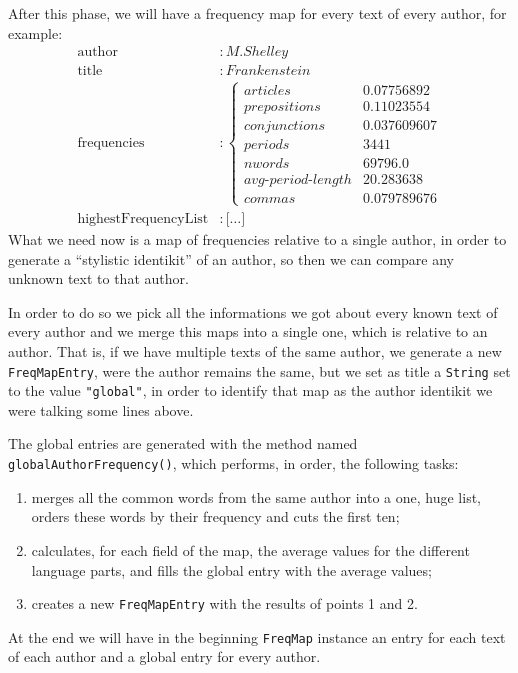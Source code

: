 \documentclass[a4paper,11pt, twoside]{article}
\begin{document}
	After this phase, we will have a frequency map for every text of every author, for example: \begin{align*}
		\text{author}&: M. Shelley \\
		\text{title} &: Frankenstein \\
		\text{frequencies}&:\begin{cases}
			articles &0.07756892 \\
			prepositions &0.11023554 \\
			conjunctions &0.037609607 \\
			periods &3441 \\
			nwords &69796.0 \\
			avg\text{-}period\text{-}length &20.283638 \\
			commas &0.079789676 
		\end{cases} \\
		\text{highestFrequencyList}&: \lbrack \dots \rbrack
	\end{align*}
	 What we need now is a map of frequencies relative to a single author, in order to generate a ``stylistic identikit''  of an author, so then we can compare any unknown text to that author.
	 
	 In order to do so we pick all the informations we got about every known text of every author and we merge this maps into a single one, which is relative to an author. That is, if we have multiple texts of the same author, we generate a new \lstinline|FreqMapEntry|, were the author remains the same, but we set as title a \lstinline|String| set to the value \lstinline|"global"|, in order to identify that map as the author identikit we were talking some lines above.
	 
	 \bigskip
	 \noindent
	 The global entries are generated with the method named \lstinline|globalAuthorFrequency()|, which performs, in order, the following tasks: \begin{enumerate}
	 	\item merges all the common words from the same author into a one, huge list, orders these words by their frequency and cuts the first ten;
	 	\item calculates, for each field of the map, the average values for the different language parts, and fills the global entry with the average values;
	 	\item creates a new \lstinline|FreqMapEntry| with the results of points 1 and 2.
	 \end{enumerate}
	 
	 \bigskip
	 \noindent
	 At the end we will have in the beginning \lstinline|FreqMap| instance an entry for each text of each author and a global entry for every author.
	
\end{document}
